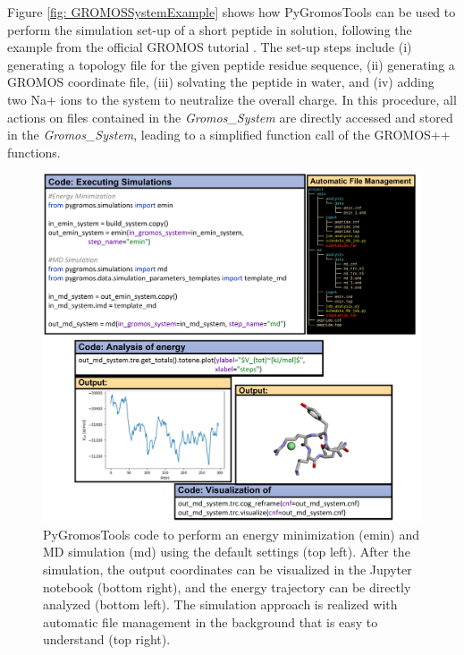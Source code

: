 Figure \ref{fig: GROMOSSystemExample} shows how PyGromosTools can be used to perform the simulation set-up of a short peptide in solution, following the example from the official GROMOS tutorial \cite{Lier2020}. The set-up steps include (i) generating a topology file for the given peptide residue sequence, (ii) generating a GROMOS coordinate file, (iii) solvating the peptide in water, and (iv) adding two Na+ ions to the system to neutralize the overall charge. In this procedure, all actions on files contained in the \textit{Gromos\_System} are directly accessed and stored in the \textit{Gromos\_System}, leading to a simplified function call of the GROMOS++ functions. 



\begin{figure}[h!]
    \centering
    \includegraphics[width=\textwidth]{fig/ApplicationExamples/codeExample_GROMOSSystemSimulation.png}
    \caption{PyGromosTools code to perform an energy minimization (emin) and MD simulation (md) using the default settings (top left). After the simulation, the output coordinates can be visualized in the Jupyter notebook (bottom right), and the energy trajectory can be directly analyzed (bottom left). The simulation approach is realized with automatic file management in the background that is easy to understand (top right).}
    \label{fig: GROMOSSystemSimulationExample}
\end{figure}

